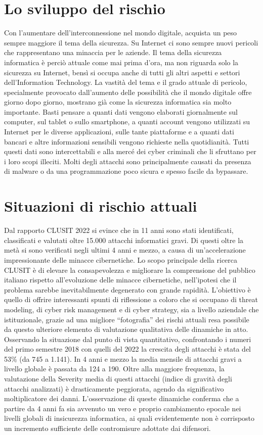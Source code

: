 \section{Lo sviluppo del rischio}
Con l’aumentare dell’interconnessione nel mondo digitale, acquista un peso sempre maggiore il tema della sicurezza. Su Internet ci sono sempre nuovi pericoli che rappresentano una minaccia per le aziende. Il tema della sicurezza informatica è perciò attuale come mai prima d’ora, ma non riguarda solo la sicurezza su Internet, bensì si occupa anche di tutti gli altri aspetti e settori dell’Information Technology. La vastità del tema e il grado attuale di pericolo, specialmente provocato dall'aumento delle possibilità che il mondo digitale offre giorno dopo giorno, mostrano già come la sicurezza informatica sia molto importante. Basti pensare a quanti dati vengono elaborati giornalmente sul computer, sul tablet o sullo smartphone, a quanti account vengono utilizzati su Internet per le diverse applicazioni, sulle tante piattaforme e a quanti dati bancari e altre informazioni sensibili vengono richieste nella quotidianità. Tutti questi dati sono intercettabili e alla mercé dei cyber criminali che li sfruttano per i loro scopi illeciti. 
Molti degli attacchi sono principalmente causati da presenza di malware o da una programmazione poco sicura e spesso facile da bypassare.
\section{Situazioni di rischio attuali}
Dal rapporto CLUSIT 2022  si evince che in 11 anni sono stati identificati, classificati e valutati oltre 15.000 attacchi informatici gravi. Di questi oltre la metà si sono verificati negli ultimi 4 anni e mezzo, a causa di un’accelerazione impressionante delle minacce cibernetiche.
Lo scopo principale della ricerca CLUSIT è di elevare la consapevolezza e migliorare la comprensione del pubblico italiano rispetto all’evoluzione delle minacce cibernetiche, nell’ipotesi che il problema sarebbe inevitabilmente degenerato con grande rapidità. L’obiettivo è quello di offrire interessanti spunti di riflessione a coloro che si occupano di threat modeling, di cyber risk management e di cyber strategy, sia a livello aziendale che istituzionale, grazie ad una migliore “fotografia” dei rischi attuali resa possibile da questo ulteriore elemento di valutazione qualitativa delle dinamiche in atto.
Osservando la situazione dal punto di vista quantitativo, confrontando i numeri del primo semestre 2018 con quelli del 2022 la crescita degli attacchi è stata del 53\% (da 745 a 1.141). In 4 anni e mezzo la media mensile di attacchi gravi a livello globale è passata da 124 a 190. Oltre alla maggiore frequenza, la valutazione della Severity media di questi attacchi (indice di gravità degli attacchi analizzati) è drasticamente peggiorata, agendo da significativo moltiplicatore dei danni. L’osservazione di queste dinamiche conferma che a partire da 4 anni fa sia avvenuto un vero e proprio cambiamento epocale nei livelli globali di insicurezza informatica, ai quali evidentemente non è corrisposto un incremento sufficiente delle contromisure adottate dai difensori.
